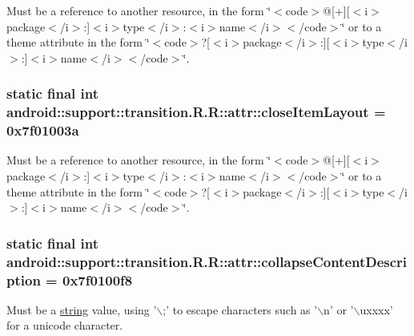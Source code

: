 Must be a reference to another resource, in the form \char`\"{}$<$code$>$@\mbox{[}+\mbox{]}\mbox{[}$<$i$>$package$<$/i$>$:\mbox{]}$<$i$>$type$<$/i$>$:$<$i$>$name$<$/i$>$$<$/code$>$\char`\"{} or to a theme attribute in the form \char`\"{}$<$code$>$?\mbox{[}$<$i$>$package$<$/i$>$:\mbox{]}\mbox{[}$<$i$>$type$<$/i$>$:\mbox{]}$<$i$>$name$<$/i$>$$<$/code$>$\char`\"{}. \hypertarget{classandroid_1_1support_1_1transition_1_1_r_1_1attr_3571a953f9dd706d6fccb48795fdb52c}{
\subsubsection[{closeItemLayout}]{\setlength{\rightskip}{0pt plus 5cm}static final int android::support::transition.R.R::attr::closeItemLayout = 0x7f01003a}}
\label{classandroid_1_1support_1_1transition_1_1_r_1_1attr_3571a953f9dd706d6fccb48795fdb52c}


Must be a reference to another resource, in the form \char`\"{}$<$code$>$@\mbox{[}+\mbox{]}\mbox{[}$<$i$>$package$<$/i$>$:\mbox{]}$<$i$>$type$<$/i$>$:$<$i$>$name$<$/i$>$$<$/code$>$\char`\"{} or to a theme attribute in the form \char`\"{}$<$code$>$?\mbox{[}$<$i$>$package$<$/i$>$:\mbox{]}\mbox{[}$<$i$>$type$<$/i$>$:\mbox{]}$<$i$>$name$<$/i$>$$<$/code$>$\char`\"{}. \hypertarget{classandroid_1_1support_1_1transition_1_1_r_1_1attr_e76fc0159b61fc70756d2d7d17dc5c32}{
\subsubsection[{collapseContentDescription}]{\setlength{\rightskip}{0pt plus 5cm}static final int android::support::transition.R.R::attr::collapseContentDescription = 0x7f0100f8}}
\label{classandroid_1_1support_1_1transition_1_1_r_1_1attr_e76fc0159b61fc70756d2d7d17dc5c32}


Must be a \hyperlink{classandroid_1_1support_1_1transition_1_1_r_1_1string}{string} value, using '$\backslash$;' to escape characters such as '$\backslash$n' or '$\backslash$uxxxx' for a unicode character. 

